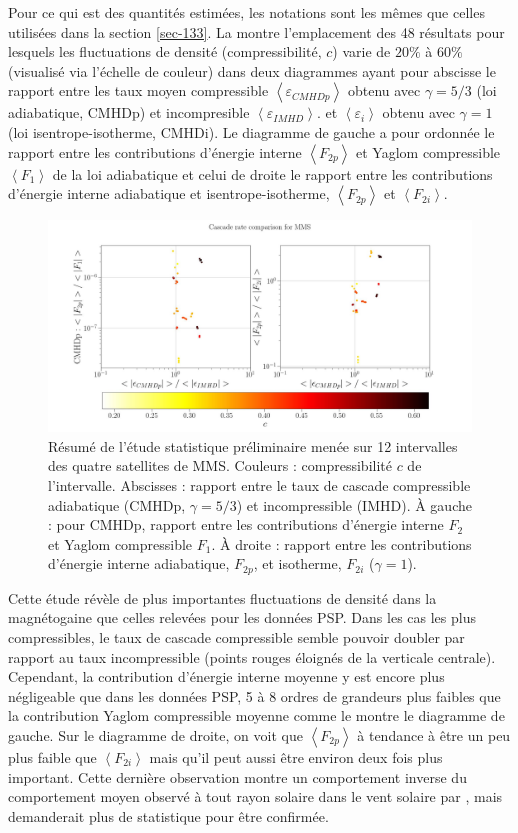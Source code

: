 Pour ce qui est des quantités estimées, les notations sont les mêmes que celles utilisées dans la section \ref{sec-133}. La  montre l'emplacement des 48 résultats pour lesquels les fluctuations de densité (compressibilité, $c$) varie de $20\%$ à $60\%$ (visualisé via l'échelle de couleur) dans deux diagrammes ayant pour abscisse le rapport entre les taux moyen compressible $\left<\varepsilon_{CMHDp}\right>$ obtenu avec $\gamma = 5/3$ (loi adiabatique, CMHDp) et incompresible $\left<\varepsilon_{IMHD}\right>$. et $\left<\varepsilon_i\right>$ obtenu avec $\gamma = 1$ (loi isentrope-isotherme, CMHDi). Le diagramme de gauche a pour ordonnée le rapport entre les contributions d'énergie interne $\left<F_{2p}\right>$ et Yaglom compressible $\left<F_{1}\right>$ de la loi adiabatique et celui de droite le rapport entre les contributions d'énergie interne adiabatique et isentrope-isotherme, $\left<F_{2p}\right>$ et $\left<F_{2i}\right>$. 
\begin{figure}[!ht]
 \centering
\includegraphics[width=\linewidth,trim=3cm 0cm 3cm 3cm, clip=true]{./Part_1/images/cascade_comp_MMS_2}
\caption{Résumé de l'étude statistique préliminaire menée sur 12 intervalles des quatre satellites de \ac{MMS}. Couleurs : compressibilité $c$ de l'intervalle. Abscisses : rapport entre le taux de cascade compressible adiabatique (CMHDp, $\gamma = 5/3$) et incompressible (IMHD). À gauche : pour CMHDp, rapport entre les contributions d'énergie interne $F_2$ et Yaglom compressible $F_1$. À droite : rapport entre les contributions d'énergie interne adiabatique, $F_{2p}$, et isotherme, $F_{2i}$ ($\gamma = 1$).}
\label{fig:loi_MMS}
\end{figure}
Cette étude révèle de plus importantes fluctuations de densité dans la magnétogaine que celles relevées pour les données \ac{PSP}. Dans les cas les plus compressibles, le taux de cascade compressible semble pouvoir doubler par rapport au taux incompressible (points rouges éloignés de la verticale centrale). Cependant, la contribution d'énergie interne moyenne y est encore plus négligeable que dans les données \ac{PSP}, 5 à 8 ordres de grandeurs plus faibles que la contribution Yaglom compressible moyenne comme le montre le diagramme de gauche. Sur le diagramme de droite, on voit que $\left<F_{2p}\right>$ à tendance à être un peu plus faible que $\left<F_{2i}\right>$ mais qu'il peut aussi être environ deux fois plus important. Cette dernière observation montre un comportement inverse du comportement moyen observé à tout rayon solaire dans le vent solaire par \cite{brodiano_statistical_2022}, mais demanderait plus de statistique pour être confirmée. 

